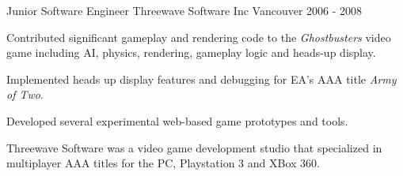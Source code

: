 \begin{cventries}
  \cventrywithsummary
    {Junior Software Engineer} %
    {Threewave Software Inc} %
    {Vancouver} %
    {2006 - 2008} %
    {
      \begin{cvitems} %
        \item {Contributed significant gameplay and rendering code to the \textit{Ghostbusters} video game including AI, physics, rendering, gameplay logic and heads-up display.}
        \item {Implemented heads up display features and debugging for EA's AAA title \textit{Army of Two}.}
        \item {Developed several experimental web-based game prototypes and tools.}
      \end{cvitems}
    }
    {
      Threewave Software was a video game development studio that specialized in multiplayer AAA titles for the PC, Playstation 3 and XBox 360.
    }

\end{cventries}
